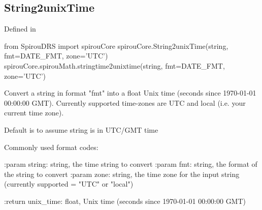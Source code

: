 \noindent\begin{minipage}{\textwidth}
\subsection{String2unixTime}

Defined in \spirouCore{}

\begin{pythonbox}
from SpirouDRS import spirouCore
spirouCore.String2unixTime(string, fmt=DATE_FMT, zone='UTC')
spirouCore.spirouMath.stringtime2unixtime(string, fmt=DATE_FMT, zone='UTC')
\end{pythonbox}

\begin{pythondocstring}
Convert a string in format "fmt" into a float Unix time (seconds since
1970-01-01 00:00:00 GMT). Currently supported time-zones are UTC and local
(i.e. your current time zone).

Default is to assume string is in UTC/GMT time

Commonly used format codes:


:param string: string, the time string to convert
:param fmt: string, the format of the string to convert
:param zone: string, the time zone for the input string
                      (currently supported =  "UTC" or "local")

:return unix_time: float, Unix time (seconds since 1970-01-01 00:00:00 GMT)
\end{pythondocstring}
\end{minipage}

